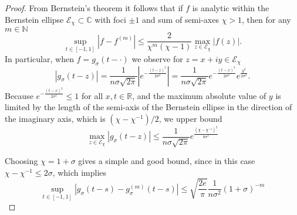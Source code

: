 \documentclass[12pt]{article}
\begin{document}
\begin{proof}
    From Bernstein's theorem \cite[Theorem 4.3]{trefethen-2008-gauss-quadrature} it follows that if $f$ is analytic within the Bernstein ellipse $\mathcal{E}_{\chi} \subset \mathbb{C}$ with foci $\pm 1$ and sum of semi-axes $\chi > 1$, then for any $m \in \mathbb{N}$
    \begin{equation}
        \sup_{t \in [-1, 1]} \left| f - f^{(m)} \right| \leq \frac{2}{\chi^m (\chi - 1)} \max_{z \in \mathcal{E}_{\chi}} |f(z)|.
        \label{equ:bernstein-bound}
    \end{equation}
    In particular, when $f = g_{\sigma}(t - \cdot)$ we observe for $z = x + iy \in \mathcal{E}_{\chi}$
    \begin{equation}
    | g_{\sigma}(t - z) | 
    = \frac{1}{n \sigma \sqrt{2 \pi}} \left| e^{-\frac{(t - z)^2}{2\sigma^2}} \right|
    = \frac{1}{n \sigma \sqrt{2 \pi}} e^{-\frac{(t - x)^2}{2\sigma^2}}e^{\frac{y^2}{2\sigma^2}}.
    \end{equation}
    Because $e^{-\frac{(t - x)^2}{2\sigma^2}} \leq 1$ for all $x, t \in \mathbb{R}$, and the maximum absolute value of $y$ is limited by the length of the semi-axis of the Bernstein ellipse in the direction of the imaginary axis, which is $(\chi - \chi^{-1}) / 2$, we upper bound
    \begin{equation}
        \max_{z \in \mathcal{E}_{\chi}} | g_{\sigma}(t - z) | 
        \leq \frac{1}{n \sigma \sqrt{2 \pi}} e^{\frac{(\chi - \chi^{-1})^2}{8 \sigma^2}} 
    \end{equation}

    Choosing $\chi = 1 + \sigma$ gives a simple and good bound, since in this case $\chi - \chi^{-1} \leq 2\sigma$, which implies
    \begin{equation}
        \sup_{t \in [-1, 1]} \left| g_{\sigma}(t - s) - g_{\sigma}^{(m)}(t - s) \right| \leq \sqrt{\frac{2e}{\pi}} \frac{1}{n \sigma^2} (1 + \sigma)^{-m}
    \end{equation}
\end{proof}

\end{document}
